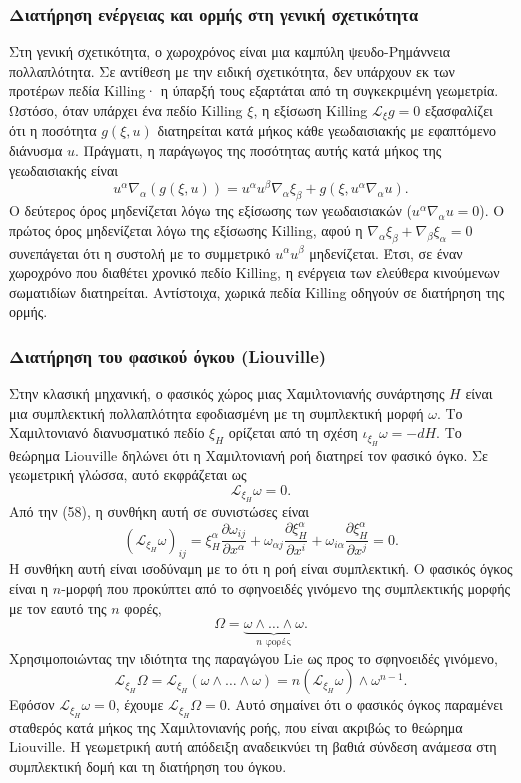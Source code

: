 \documentclass[12pt]{article}
\begin{document}
\subsubsection{Διατήρηση ενέργειας και ορμής στη γενική σχετικότητα}

Στη γενική σχετικότητα, ο χωροχρόνος είναι μια καμπύλη ψευδο-Ρημάννεια πολλαπλότητα. Σε αντίθεση με την ειδική σχετικότητα, δεν υπάρχουν εκ των προτέρων πεδία Killing· η ύπαρξή τους εξαρτάται από τη συγκεκριμένη γεωμετρία. Ωστόσο, όταν υπάρχει ένα πεδίο Killing $\xi$, η εξίσωση Killing $\mathcal{L}_\xi g = 0$ εξασφαλίζει ότι η ποσότητα $g(\xi, u)$ διατηρείται κατά μήκος κάθε γεωδαισιακής με εφαπτόμενο διάνυσμα $u$. Πράγματι, η παράγωγος της ποσότητας αυτής κατά μήκος της γεωδαισιακής είναι
\[
u^\alpha \nabla_\alpha (g(\xi, u)) = u^\alpha u^\beta \nabla_\alpha \xi_\beta + g(\xi, u^\alpha \nabla_\alpha u).
\]
Ο δεύτερος όρος μηδενίζεται λόγω της εξίσωσης των γεωδαισιακών ($u^\alpha \nabla_\alpha u = 0$). Ο πρώτος όρος μηδενίζεται λόγω της εξίσωσης Killing, αφού η $\nabla_\alpha \xi_\beta + \nabla_\beta \xi_\alpha = 0$ συνεπάγεται ότι η συστολή με το συμμετρικό $u^\alpha u^\beta$ μηδενίζεται. Έτσι, σε έναν χωροχρόνο που διαθέτει χρονικό πεδίο Killing, η ενέργεια των ελεύθερα κινούμενων σωματιδίων διατηρείται. Αντίστοιχα, χωρικά πεδία Killing οδηγούν σε διατήρηση της ορμής.

\subsubsection{Διατήρηση του φασικού όγκου (Liouville)}

Στην κλασική μηχανική, ο φασικός χώρος μιας Χαμιλτονιανής συνάρτησης $H$ είναι μια συμπλεκτική πολλαπλότητα εφοδιασμένη με τη συμπλεκτική μορφή $\omega$. Το Χαμιλτονιανό διανυσματικό πεδίο $\xi_H$ ορίζεται από τη σχέση $\iota_{\xi_H} \omega = -dH$. Το θεώρημα Liouville δηλώνει ότι η Χαμιλτονιανή ροή διατηρεί τον φασικό όγκο. Σε γεωμετρική γλώσσα, αυτό εκφράζεται ως
\[
\mathcal{L}_{\xi_H} \omega = 0.
\]
Από την (58), η συνθήκη αυτή σε συνιστώσες είναι
\[
(\mathcal{L}_{\xi_H} \omega)_{ij} = \xi_H^\alpha \frac{\partial \omega_{ij}}{\partial x^\alpha} + \omega_{\alpha j} \frac{\partial \xi_H^\alpha}{\partial x^i} + \omega_{i\alpha} \frac{\partial \xi_H^\alpha}{\partial x^j} = 0.
\]
Η συνθήκη αυτή είναι ισοδύναμη με το ότι η ροή είναι συμπλεκτική. Ο φασικός όγκος είναι η $n$-μορφή που προκύπτει από το σφηνοειδές γινόμενο της συμπλεκτικής μορφής με τον εαυτό της $n$ φορές,
\[
\Omega = \underbrace{\omega \wedge \dots \wedge \omega}_{n \text{ φορές}}.
\]
Χρησιμοποιώντας την ιδιότητα της παραγώγου Lie ως προς το σφηνοειδές γινόμενο,
\[
\mathcal{L}_{\xi_H} \Omega = \mathcal{L}_{\xi_H} (\omega \wedge \dots \wedge \omega) = n (\mathcal{L}_{\xi_H} \omega) \wedge \omega^{n-1}.
\]
Εφόσον $\mathcal{L}_{\xi_H} \omega = 0$, έχουμε $\mathcal{L}_{\xi_H} \Omega = 0$. Αυτό σημαίνει ότι ο φασικός όγκος παραμένει σταθερός κατά μήκος της Χαμιλτονιανής ροής, που είναι ακριβώς το θεώρημα Liouville. Η γεωμετρική αυτή απόδειξη αναδεικνύει τη βαθιά σύνδεση ανάμεσα στη συμπλεκτική δομή και τη διατήρηση του όγκου.
\end{document}
